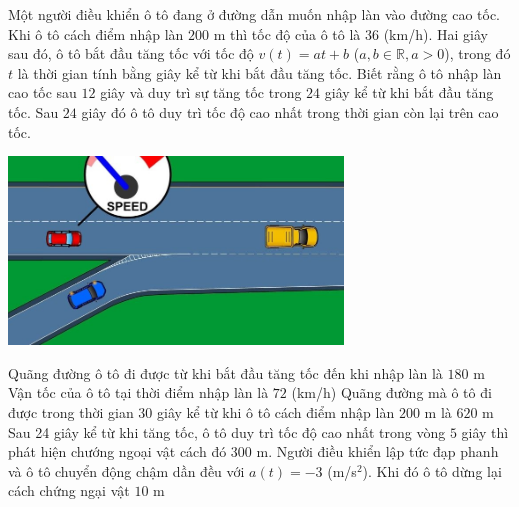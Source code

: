 \begin{ex}%
	Một người điều khiển ô tô đang ở đường dẫn muốn nhập làn vào đường cao tốc. Khi ô tô cách điểm nhập làn $200$ m thì tốc độ của ô tô là $36$ (km/h). Hai giây sau đó, ô tô bắt đầu tăng tốc với tốc độ $v(t)=at+b$ ($a,b\in\mathbb{R},a>0$), trong đó $t$ là thời gian tính bằng giây kể từ khi bắt đầu tăng tốc. Biết rằng ô tô nhập làn cao tốc sau $12$ giây và duy trì sự tăng tốc trong $24$ giây kể từ khi bắt đầu tăng tốc. Sau $24$ giây đó ô tô duy trì tốc độ cao nhất trong thời gian còn lại trên cao tốc.\\
	\centerline{\includegraphics[height=5cm]{images/2.14}}
	\choiceTF
	{\True Quãng đường ô tô đi được từ khi bắt đầu tăng tốc đến khi nhập làn là $180$ m}
	{Vận tốc của ô tô tại thời điểm nhập làn là $72$ (km/h)}
	{Quãng đường mà ô tô đi được trong thời gian $30$ giây kể từ khi ô tô cách điểm nhập làn $200$ m là $620$ m}
	{Sau 24 giây kể từ khi tăng tốc, ô tô duy trì tốc độ cao nhất trong vòng $5$ giây thì phát hiện chướng ngoại vật cách đó $300$ m. Người điều khiển lập tức đạp phanh và ô tô chuyển động chậm dần đều với $a(t)=-3$ (m/s$^2$). Khi đó ô tô dừng lại cách chứng ngại vật $10$ m}
\end{ex}
